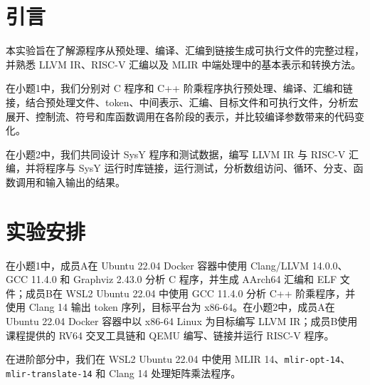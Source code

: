 \section{引言}

本实验旨在了解源程序从预处理、编译、汇编到链接生成可执行文件的完整过程，并熟悉 LLVM IR、RISC-V 汇编以及 MLIR 中端处理中的基本表示和转换方法。

在小题1中，我们分别对 C 程序和 C++ 阶乘程序执行预处理、编译、汇编和链接，结合预处理文件、token、中间表示、汇编、目标文件和可执行文件，分析宏展开、控制流、符号和库函数调用在各阶段的表示，并比较编译参数带来的代码变化。

在小题2中，我们共同设计 SysY 程序和测试数据，编写 LLVM IR 与 RISC-V 汇编，并将程序与 SysY 运行时库链接，运行测试，分析数组访问、循环、分支、函数调用和输入输出的结果。

\section{实验安排}
在小题1中，成员A在 Ubuntu 22.04 Docker 容器中使用 Clang/LLVM 14.0.0、GCC 11.4.0 和 Graphviz 2.43.0 分析 C 程序，并生成 AArch64 汇编和 ELF 文件；成员B在 WSL2 Ubuntu 22.04 中使用 GCC 11.4.0 分析 C++ 阶乘程序，并使用 Clang 14 输出 token 序列，目标平台为 x86-64。在小题2中，成员A在 Ubuntu 22.04 Docker 容器中以 x86-64 Linux 为目标编写 LLVM IR；成员B使用课程提供的 RV64 交叉工具链和 QEMU 编写、链接并运行 RISC-V 程序。

在进阶部分中，我们在 WSL2 Ubuntu 22.04 中使用 MLIR 14、\texttt{mlir-opt-14}、\texttt{mlir-translate-14} 和 Clang 14 处理矩阵乘法程序。
